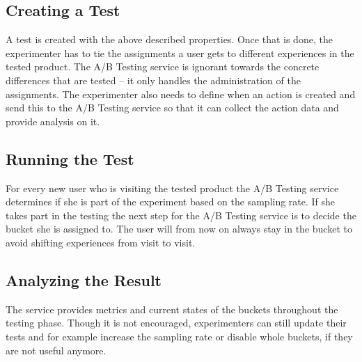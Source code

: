 \documentclass[main.tex]{subfiles}
\begin{document}
\subsection{Creating a Test} 
A test is created with the above described properties. Once that is done, the experimenter has to tie the assignments a user gets to different experiences in the tested product. The A/B Testing service is ignorant towards the concrete differences that are tested -- it only handles the administration of the assignments. The experimenter also needs to define when an action is created and send this to the A/B Testing service so that it can collect the action data and provide analysis on it.
\subsection{Running the Test}
For every new user who is visiting the tested product the A/B Testing service determines if she is part of the experiment based on the sampling rate. If she takes part in the testing the next step for the A/B Testing service is to decide the bucket she is assigned to. The user will from now on always stay in the bucket to avoid shifting experiences from visit to visit.
\subsection{Analyzing the Result}
The service provides metrics and current states of the buckets throughout the testing phase. Though it is not encouraged, experimenters can still update their tests and for example increase the sampling rate or disable whole buckets, if they are not useful anymore.
\end{document}
